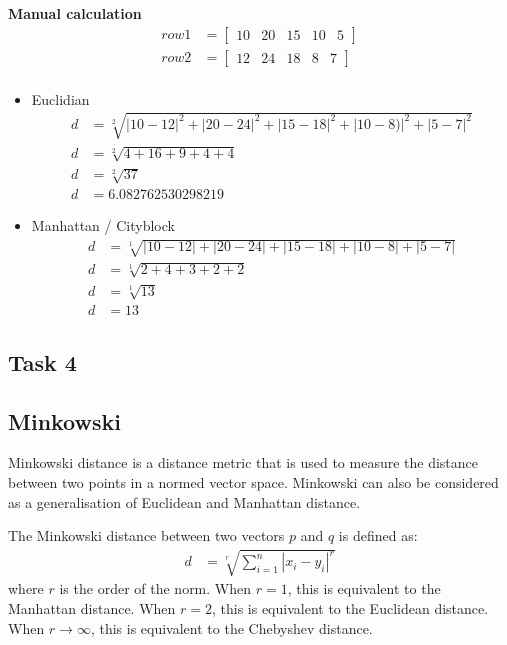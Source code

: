 \documentclass[12pt,titlepage]{article}
\begin{document}
\large{\textbf{Manual calculation}}
\begin{align*}
    row1 &= \begin{bmatrix}
        10 & 20 & 15 & 10 & 5
    \end{bmatrix} \\
    row2 &= \begin{bmatrix}
        12 & 24 & 18 & 8 & 7
    \end{bmatrix} \\
\end{align*}
\begin{itemize}
    \item {
        Euclidian
        \begin{align*}
            d &= \sqrt[2]{|10 - 12|^2 + |20 - 24|^2 + |15 - 18|^2 + |10 - 8)|^2 + |5 - 7|^2} \\
            d &= \sqrt[2]{4 + 16 + 9 + 4 + 4} \\
            d &= \sqrt[2]{37} \\
            d &= 6.082762530298219
        \end{align*}
    }
    \item {
        Manhattan / Cityblock
        \begin{align*}
            d &= \sqrt[1]{|10 - 12| + |20 - 24| + |15 - 18| + |10 - 8| + |5 - 7|} \\
            d &= \sqrt[1]{2 + 4 + 3 + 2 + 2} \\
            d &= \sqrt[1]{13} \\
            d &= 13
        \end{align*}
    }
\end{itemize}

\subsection{Task 4}
\subsection*{Minkowski}
Minkowski distance is a distance metric that is used to measure the distance between two points in a normed vector space. 
Minkowski can also be considered as a generalisation of Euclidean and Manhattan distance.

The Minkowski distance between two vectors $p$ and $q$ is defined as:
\begin{align*}
    d &= \sqrt[r]{\sum_{i=1}^{n} |x_i - y_i|^r}
\end{align*}
where $r$ is the order of the norm. When $r = 1$, this is equivalent to the Manhattan distance. 
When $r = 2$, this is equivalent to the Euclidean distance. 
When $r \rightarrow \infty$, this is equivalent to the Chebyshev distance.
\end{document}
